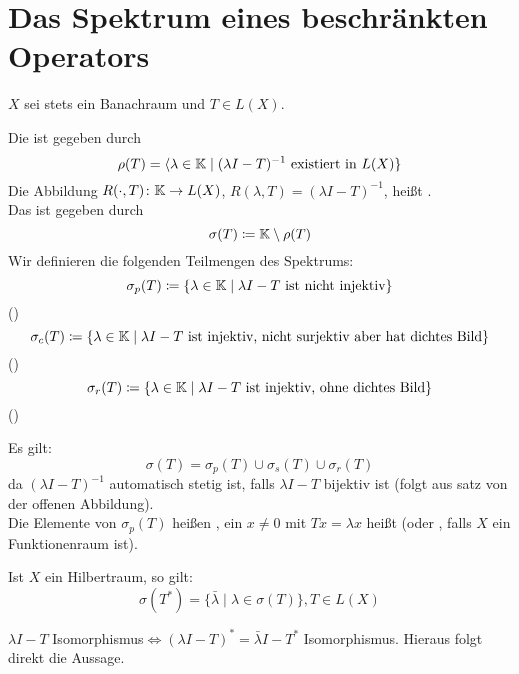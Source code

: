 \chapter{Das Spektrum eines beschr\"ankten Operators}
$ X $ sei stets ein Banachraum und $ T\in L(X) $.
\begin{definition}
	Die  ist gegeben durch
	\[ \rho(T)=\langle\lambda\in\mathbb{K}\mid (\lambda I-T)^{-1}\text{ existiert in }L(X)\rbrace \]
	Die Abbildung $ R(\cdot, T)\colon\mathbb{K}\rightarrow L(X) $, $ R(\lambda, T)=(\lambda I-T)^{-1} $, hei\ss t .\\
	Das  ist gegeben durch
	\[ \sigma(T)\coloneqq\mathbb{K}\setminus\rho(T) \]
	Wir definieren die folgenden Teilmengen des Spektrums:
	\[ \sigma_p(T)\coloneqq\lbrace \lambda\in\mathbb{K}\mid \lambda I-T\text{ ist nicht injektiv}\rbrace \]
	()
	\[ \sigma_c(T)\coloneqq\lbrace \lambda\in\mathbb{K}\mid\lambda I-T\text{ ist injektiv, nicht surjektiv aber hat dichtes Bild}\rbrace \]
	()
	\[ \sigma_r(T)\coloneqq\lbrace \lambda\in\mathbb{K}\mid\lambda I-T\text{ ist injektiv, ohne dichtes Bild}\rbrace \]
	()
\end{definition}
\begin{bemerkung*}
	Es gilt:
	\[ \sigma(T)=\sigma_p(T)\cup\sigma_s(T)\cup\sigma_r(T) \]
	da $ (\lambda I-T)^{-1} $ automatisch stetig ist, falls $ \lambda I-T $ bijektiv ist (folgt aus satz von der offenen Abbildung).\\
	Die Elemente von $ \sigma_p(T) $ hei\ss en , ein $ x\neq 0 $ mit $ Tx=\lambda x $ hei\ss t  (oder , falls $ X $ ein Funktionenraum ist).
\end{bemerkung*}
\begin{satz}
	Ist $ X $ ein Hilbertraum, so gilt:
	\[ \sigma(T^\ast)=\lbrace \bar{\lambda}\mid\lambda\in\sigma(T)\rbrace, T\in L(X) \]
\end{satz}
\begin{beweis}
	$ \lambda I-T $ Isomorphismus$ \Leftrightarrow(\lambda I-T)^\ast=\bar{\lambda}I-T^\ast $ Isomorphismus. Hieraus folgt direkt die Aussage.
\end{beweis}
